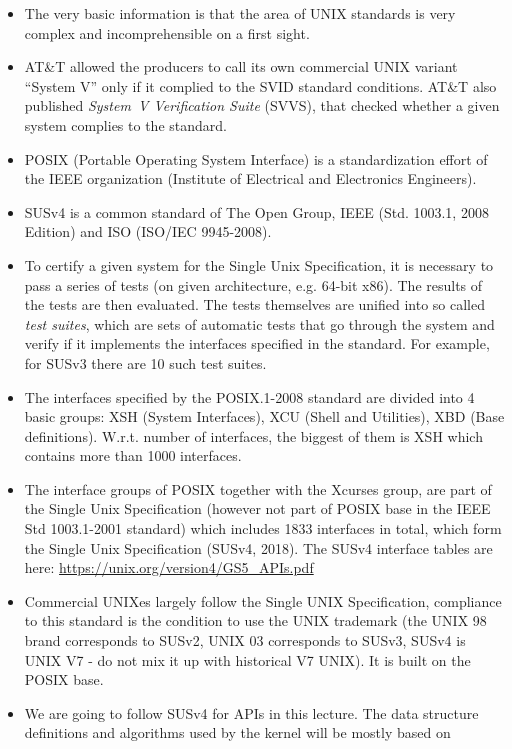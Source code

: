 \begin{itemize}
\item The very basic information is that the area of UNIX standards is very
complex and incomprehensible on a first sight.
\item AT\&T allowed the producers to call its own commercial UNIX variant
``System V'' only if it complied to the SVID standard conditions. AT\&T also
published \emph{System~V Verification Suite} (SVVS), that checked whether a given
system complies to the standard.
\item POSIX (Portable Operating System Interface) is a standardization effort
of the IEEE organization (Institute of Electrical and Electronics Engineers).
\item SUSv4 is a common standard of The Open Group, IEEE (Std. 1003.1, 2008
Edition) and ISO (ISO/IEC 9945-2008).
\item To certify a given system for the Single Unix Specification, it is necessary
to pass a series of tests (on given architecture, e.g. 64-bit x86).
The results of the tests are then evaluated. The tests themselves are unified into
so called \emph{test suites}, which are sets of automatic tests that go through
the system and verify if it implements the interfaces specified in the standard.
For example, for SUSv3 there are 10 such test suites.
\item The interfaces specified by the POSIX.1-2008 standard are divided into 4
basic groups: XSH (System Interfaces), XCU (Shell and Utilities), XBD
(Base definitions). W.r.t. number of interfaces, the biggest of them is XSH which
contains more than 1000 interfaces.
\item The interface groups of POSIX together with the Xcurses group, are part
of the Single Unix Specification (however not part of POSIX base in the IEEE Std
1003.1-2001 standard) which includes 1833 interfaces in total, which form the Single Unix
Specification (SUSv4, 2018). The SUSv4 interface tables are here:
\url{https://unix.org/version4/GS5\_APIs.pdf}
\item Commercial UNIXes largely follow the Single UNIX Specification, compliance
to this standard is the condition to use the UNIX trademark
(the UNIX 98 brand corresponds to SUSv2, UNIX 03 corresponds to SUSv3, SUSv4 is
UNIX V7 - do not mix it up with historical V7 UNIX). It is built on the POSIX
base.
\item We are going to follow SUSv4 for APIs in this lecture. The data structure
definitions and algorithms used by the kernel will be mostly based on

\end{itemize}
